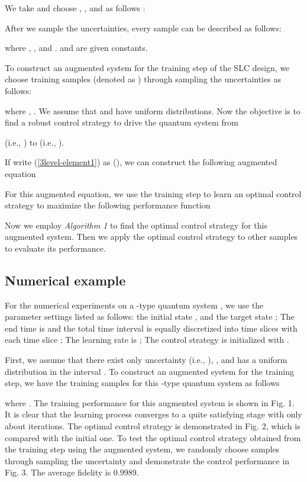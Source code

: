 \documentclass[letterpaper, 10 pt, conference]{ieeeconf}
\begin{document}
We take  and choose , ,
 and  as follows \cite{Hou et al 2012}:



After we sample the uncertainties, every sample can be described as follows:

where , ,  and .  and  are given
constants.

To construct an augmented system for the training step of the
SLC design, we choose  training samples
(denoted as ) through sampling the uncertainties as follows:


where , . We assume that  and  have uniform distributions. Now the
objective is to find a robust control strategy  to drive the quantum system from

(i.e.,
)
to  (i.e., ).

If write (\ref{3level-element1}) as
 (), we can
construct the following augmented equation

For this augmented equation, we use the training step to learn
an optimal control strategy  to maximize the following
performance function


Now we employ \emph{Algorithm 1} to find the optimal control strategy
 for this augmented
system. Then we apply the optimal control strategy to other
samples to evaluate its performance.


\subsection{Numerical example}
For the numerical experiments on a -type quantum system \cite{You and Nori 2011},
we use the parameter settings listed as follows: the initial state
,
and the target state ; The end time is 
and the total time interval  is equally discretized into
 time slices with each time slice ; The learning rate is
; The control
strategy is initialized with .

First, we assume that there exist only uncertainty  (i.e., ), ,  and  has a uniform
distribution in the interval . To construct an augmented system for the
training step, we have the training samples for
this -type quantum system as follows

where . The training
performance for this augmented system is shown in Fig. 1. It is
clear that the
learning process converges to a quite satisfying stage with only
about  iterations. The optimal control strategy is
demonstrated in Fig. 2, which is compared with the initial one.
To test the optimal control strategy obtained from the training
step using the augmented system, we randomly choose 
samples through sampling the uncertainty  and demonstrate the control performance
in Fig. 3. The average fidelity is 0.9989.
\end{document}
